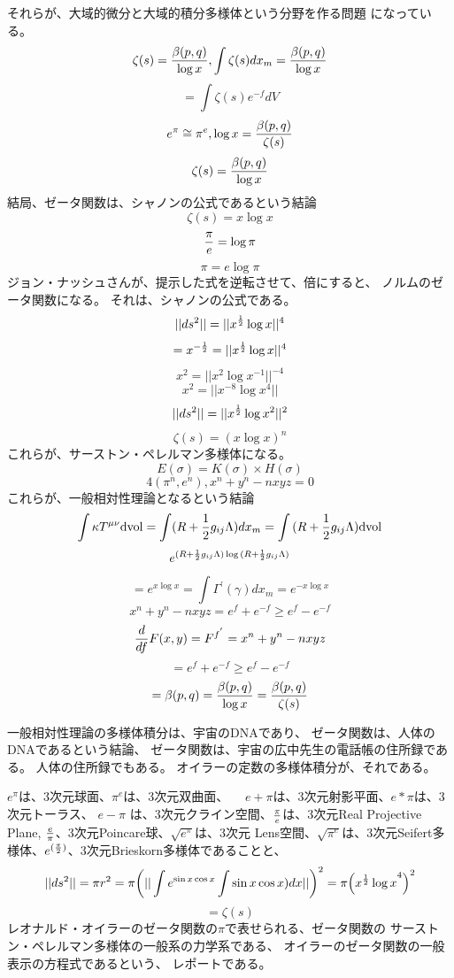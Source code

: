 \documentclass{jsarticle}
\begin{document}
	 それらが、大域的微分と大域的積分多様体という分野を作る問題
	 になっている。
	 $$ \zeta(s) = {\beta(p,q) \over {\log x}}, \int \zeta(s) dx_m =
	 {\beta(p,q) \over {\log x}} $$
	 $$ = \int \zeta(s) e^{-f}dV $$
	 $$ e^{\pi} \cong \pi^{e}, \log x = {\beta(p,q) \over {\zeta(s)}} $$
	 $$ \zeta(s) = {\beta(p,q) \over {\log x}} $$
	 結局、ゼータ関数は、シャノンの公式であるという結論
	 $$ \zeta(s) = x\log x $$
	 $$ {\pi \over {e}} = \log \pi $$
	 $$ \pi = e \log \pi $$
	 ジョン・ナッシュさんが、提示した式を逆転させて、倍にすると、
	 ノルムのゼータ関数になる。
	 それは、シャノンの公式である。
         $$ ||ds^2|| = || x^{1 \over 2}\log x||^{4}  $$
	 $$ = x^{-{1 \over 2}} = || x^{1 \over 2} \log x||^{4} $$
	 $$ x^2 = ||x^2 \log x^{-1}||^{-4} $$
	 $$ x^2 = ||x^{-8} \log x^{4}|| $$
	 $$ ||ds^2|| = ||{x^{1 \over 2}  \log x^2}||^2 $$
	 $$ \zeta(s) = (x\log x)^n $$
	 これらが、サーストン・ペレルマン多様体になる。
	 $$ E(\sigma) = K(\sigma) \times H(\sigma) $$
	 $$ 4(\pi^{n}, e^{n}), x^n + y^n -n xyz = 0 $$
	 これらが、一般相対性理論となるという結論
	 $$ \int \kappa T^{\mu\nu} \mathrm{dvol} = \int (R + {1 \over 2}
	 g_{ij}\Lambda)dx_m = \int{(R + {1 \over 2}g_{ij}\Lambda)}\mathrm{
		 dvol} $$
	 $$ e^{(R+{1\over 2}g_{ij}\Lambda)\log{( R+{1\over 2}g_{ij}
	 \Lambda)}} $$
	 $$ = e^{x\log x} = \int \Gamma^{'}(\gamma)dx_m = e^{-x\log x} $$
	 $$ x^n + y^n -nxyz = e^{f} + e^{-f} \ge e^{f} - e^{-f} $$
	 $$ {d \over {d f}}F(x,y) = F^{f^{'}} = x^n + y^n -nxyz $$
	 $$ =  e^{f} + e^{-f} \ge e^{f} - e^{-f} $$
	 $$ = \beta(p,q) = {\beta(p,q) \over {\log x}} = {\beta(p,q) \over 
	 \zeta(s)} $$

	 一般相対性理論の多様体積分は、宇宙のDNAであり、
	 ゼータ関数は、人体のDNAであるという結論、
	 ゼータ関数は、宇宙の広中先生の電話帳の住所録である。
	 人体の住所録でもある。
	 オイラーの定数の多様体積分が、それである。



	 $e^{\pi} $は、3次元球面、$\pi^{e}$は、3次元双曲面、
	 　$e+\pi$は、3次元射影平面、$e*\pi$は、3次元トーラス、
	 $e-\pi$
	 は、3次元クライン空間、${\pi \over e}$は、3次元Real Projective Plane,
	 ${e \over {\pi}}$、3次元Poincare球、$\sqrt{{e^{\pi}}}$は、3次元
	 Lens空間、$\sqrt{\pi^{e}}$は、3次元Seifert多様体、$e^{({\pi \over 2})
	 }$、3次元Brieskorn多様体であることと、
	 $$ ||ds^2|| = \pi r^2 = \pi {\left(||\int e^{\sin x\cos x} \int \sin x \cos x)dx ||\right)^{2}} = \pi {\left({x^{1 \over 2}\log x}^{4}\right)}^{2}  $$
	 $$ = \zeta(s) $$
	 レオナルド・オイラーのゼータ関数の$\pi$で表せられる、ゼータ関数の
	 サーストン・ペレルマン多様体の一般系の力学系である、
	 オイラーのゼータ関数の一般表示の方程式であるという、
	 レポートである。
\end{document}
